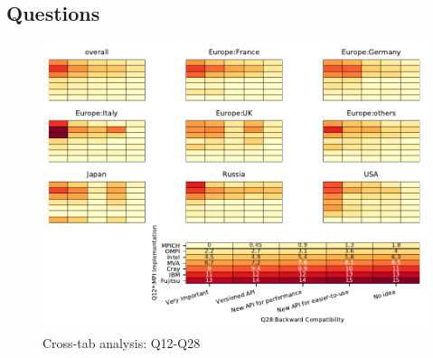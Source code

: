 
\subsection{Questions}


\begin{figure}
\begin{center}
\includegraphics[width=12cm]{../pdfs/Q12-Q28.pdf}
\caption{Cross-tab analysis: Q12-Q28}
\label{fig:Q12-Q28}
\end{center}
\end{figure}
